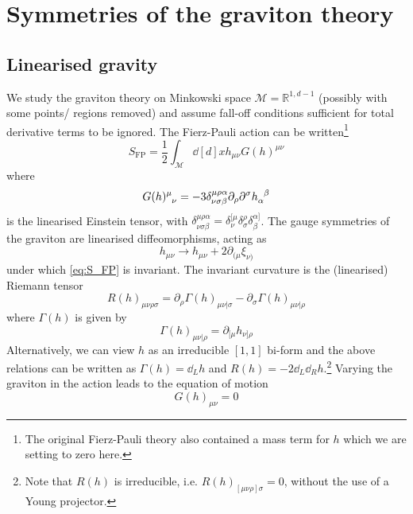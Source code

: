 \section{Symmetries of the graviton theory}
\label{sec:graviton_symmetries}

\subsection{Linearised gravity}

We study the graviton theory on Minkowski space $\mathcal{M} = \mathbb{R}^{1,d-1}$ (possibly with some points/ regions removed) and assume fall-off conditions sufficient for total derivative terms to be ignored. The Fierz-Pauli action can be written\footnote{The original Fierz-Pauli theory \cite{Fierz:1939ix} also contained a mass term for $h$ which we are setting to zero here.}
\begin{equation}\label{eq:S_FP}
    S_{\text{FP}} = \frac{1}{2} \int_{\mathcal{M}} \dd[d]{x} h_{\mu\nu} G(h)^{\mu\nu} 
\end{equation}
where
\begin{equation}\label{eq:G(h)}
    G(h)\indices{^\mu_\nu} = -3 \delta^{\mu\rho\alpha}_{\nu\sigma\beta} \partial_\rho \partial^\sigma h\indices{_\alpha^\beta} 
\end{equation}
is the linearised Einstein tensor, with $\delta^{\mu\rho\alpha}_{\nu\sigma\beta} = \delta^{[\mu}_{\nu} \delta^\rho_\sigma \delta^{\alpha]}_\beta$. 
The gauge symmetries of the graviton are linearised diffeomorphisms, acting as
\begin{equation}\label{eq:linear_diffeo}
    h_{\mu\nu} \to h_{\mu\nu} + 2\partial_{(\mu} \xi_{\nu)}
\end{equation}
under which \eqref{eq:S_FP} is invariant. The invariant curvature is the (linearised) Riemann tensor
\begin{equation}\label{eq:riemann}
    R(h)_{\mu\nu\rho\sigma} = \partial_\rho \Gamma(h)_{\mu\nu|\sigma} - \partial_\sigma \Gamma(h)_{\mu\nu|\rho}
\end{equation}
where   $\Gamma(h)$ is given by
\begin{equation}\label{eq:Gamma}
    \Gamma(h)_{\mu\nu|\rho} = \partial_{[\mu} h_{\nu]\rho}
\end{equation}
Alternatively, we can view $h$ as an irreducible $[1,1]$ bi-form and the above relations can be written as $\Gamma(h) = \dd_L h$ and $R(h) = -2\dd_L \dd_R h$.\footnote{Note that $R(h)$ is irreducible, i.e. $R(h)_{[\mu\nu\rho]\sigma}=0$, without the use of a Young projector.}
Varying the graviton in the   action leads to the equation of motion
\begin{equation}
    G(h)_{\mu\nu} = 0
\end{equation}

